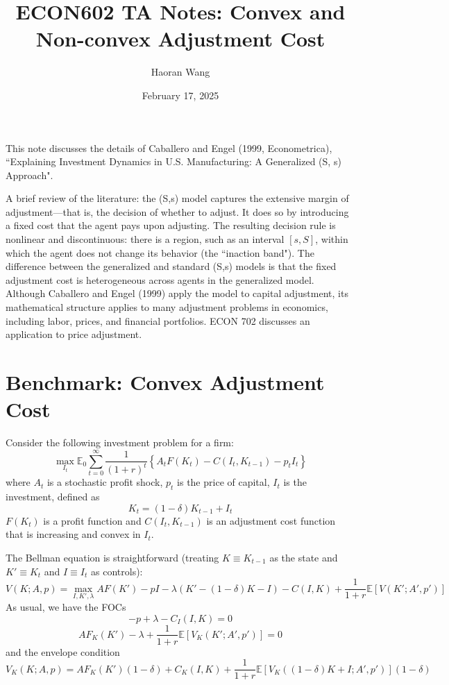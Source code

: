 \documentclass[12pt]{article}
\title{ECON602 TA Notes: Convex and Non-convex Adjustment Cost}
\author{Haoran Wang}
\date{February 17, 2025}
\begin{document}
	
	\maketitle
	
	\tableofcontents
	
	This note discusses the details of Caballero and Engel (1999, Econometrica), ``Explaining Investment Dynamics in U.S. Manufacturing: A Generalized (S, s) Approach". 
	
		A brief review of the literature: the (S,s) model captures the extensive margin of adjustment---that is, the decision of whether to adjust. It does so by introducing a fixed cost that the agent pays upon adjusting. The resulting decision rule is nonlinear and discontinuous: there is a region, such as an interval $[s, S]$, within which the agent does not change its behavior (the ``inaction band"). The difference between the generalized and standard (S,s) models is that the fixed adjustment cost is heterogeneous across agents in the generalized model. Although Caballero and Engel (1999) apply the model to capital adjustment, its mathematical structure applies to many adjustment problems in economics, including labor, prices, and financial portfolios. ECON 702 discusses an application to price adjustment.
	
\section{Benchmark: Convex Adjustment Cost}
Consider the following investment problem for a firm:
\begin{equation}
	\max_{I_t} \mathbb{E}_0 \sum_{t=0}^\infty \frac{1}{(1+r)^t} \left\{A_t F(K_t) - C(I_t, K_{t-1}) - p_t I_t \right\}
\end{equation}
where $A_t$ is a stochastic profit shock, $p_t$ is the price of capital, $I_t$ is the investment, defined as
\begin{equation}
	K_{t} = (1-\delta) K_{t-1} + I_t
\end{equation}
$F(K_t)$ is a profit function and $C(I_t, K_{t-1})$ is an adjustment cost function that is increasing and convex in $I_t$. 


The Bellman equation is straightforward (treating $K \equiv K_{t-1}$ as the state and $K' \equiv K_t$ and $I \equiv I_t$ as controls):
\begin{equation} \label{eq:value_func}
	V(K; A, p) = \max_{I,K', \lambda} A F(K') - p I - \lambda (K'-(1-\delta) K - I)- C(I, K) + \frac{1}{1+r} \mathbb{E}[V(K'; A' , p')]
\end{equation}
As usual, we have the FOCs
\begin{equation}
	- p + \lambda - C_I(I, K) = 0
\end{equation}
\begin{equation}
	A F_K(K') - \lambda + \frac{1}{1+r} \mathbb{E}[V_K(K'; A' , p')] = 0
\end{equation}
and the envelope condition
\begin{equation}
	V_K(K; A, p) = A F_K(K') (1-\delta) + C_K(I, K) + \frac{1}{1+r}  \mathbb{E}[V_K((1-\delta)K + I; A' , p')] (1-\delta)
\end{equation}
\end{document}
